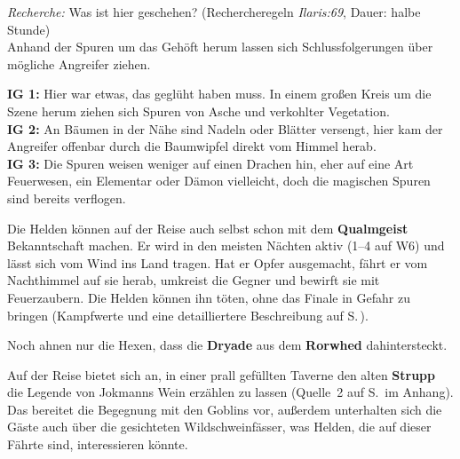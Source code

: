 {\emph{Recherche:} Was ist hier geschehen? (Rechercheregeln \emph{Ilaris:69}, Dauer: halbe Stunde)\\
Anhand der Spuren um das Gehöft herum lassen sich Schlussfolgerungen über mögliche Angreifer ziehen.

\textbf{IG 1:} Hier war etwas, das geglüht haben muss. In einem großen Kreis um die Szene herum ziehen sich Spuren von Asche und verkohlter Vegetation.\\
\textbf{IG 2:} An Bäumen in der Nähe sind Nadeln oder Blätter versengt, hier kam der Angreifer offenbar durch die Baumwipfel direkt vom Himmel herab.\\
\textbf{IG 3:} Die Spuren weisen weniger auf einen Drachen hin, eher auf eine Art Feuerwesen, ein Elementar oder Dämon vielleicht, doch die magischen Spuren sind bereits verflogen.
}

\vfill

Die Helden können auf der Reise auch selbst schon mit dem \textbf{Qualmgeist} Bekanntschaft machen.
Er wird in den meisten Nächten aktiv (1--4 auf W6) und lässt sich vom Wind ins Land tragen.
Hat er Opfer ausgemacht, fährt er vom Nachthimmel auf sie herab, umkreist die Gegner und bewirft sie mit Feuerzaubern.
Die Helden können ihn töten, ohne das Finale in Gefahr zu bringen (Kampfwerte und eine detailliertere Beschreibung auf S.\,\pageref{geist}).

Noch ahnen nur die Hexen, dass die \textbf{Dryade} aus dem \textbf{Rorwhed} dahintersteckt.

\newpage

Auf der Reise bietet sich an, in einer prall gefüllten Taverne den alten \textbf{Strupp} die Legende von Jokmanns Wein erzählen zu lassen (Quelle~2 auf S.\,\pageref{aiw_quelle2} im Anhang).
Das bereitet die Begegnung mit den Goblins vor, außerdem unterhalten sich die Gäste auch über die gesichteten Wildschweinfässer, was Helden, die auf dieser Fährte sind, interessieren könnte.

